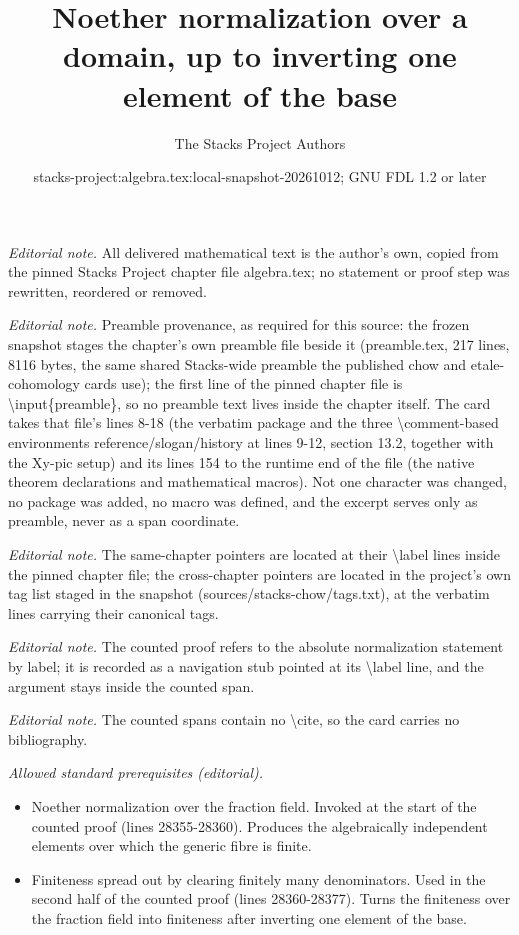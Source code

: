 \documentclass[10pt,a4paper]{amsart}
\title{Noether normalization over a domain, up to inverting one element of the base}
\author{The Stacks Project Authors}
\date{stacks-project:algebra.tex:local-snapshot-20261012; GNU FDL 1.2 or later}
\theoremstyle{plain}
\theoremstyle{definition}
\theoremstyle{remark}
\numberwithin{equation}{subsection}
\begin{document}
\maketitle
\noindent\textit{Editorial note.} All delivered mathematical text is the author's own, copied from the pinned Stacks Project chapter file algebra.tex; no statement or proof step was rewritten, reordered or removed.\par\medskip
\noindent\textit{Editorial note.} Preamble provenance, as required for this source: the frozen snapshot stages the chapter's own preamble file beside it (preamble.tex, 217 lines, 8116 bytes, the same shared Stacks-wide preamble the published chow and etale-cohomology cards use); the first line of the pinned chapter file is \textbackslash{}input\{preamble\}, so no preamble text lives inside the chapter itself. The card takes that file's lines 8-18 (the verbatim package and the three \textbackslash{}comment-based environments reference/slogan/history at lines 9-12, section 13.2, together with the Xy-pic setup) and its lines 154 to the runtime end of the file (the native theorem declarations and mathematical macros). Not one character was changed, no package was added, no macro was defined, and the excerpt serves only as preamble, never as a span coordinate.\par\medskip
\noindent\textit{Editorial note.} The same-chapter pointers are located at their \textbackslash{}label lines inside the pinned chapter file; the cross-chapter pointers are located in the project's own tag list staged in the snapshot (sources/stacks-chow/tags.txt), at the verbatim lines carrying their canonical tags.\par\medskip
\noindent\textit{Editorial note.} The counted proof refers to the absolute normalization statement by label; it is recorded as a navigation stub pointed at its \textbackslash{}label line, and the argument stays inside the counted span.\par\medskip
\noindent\textit{Editorial note.} The counted spans contain no \textbackslash{}cite, so the card carries no bibliography.\par\medskip
\noindent\textit{Allowed standard prerequisites (editorial).}\begin{itemize}
\item Noether normalization over the fraction field. Invoked at the start of the counted proof (lines 28355-28360). Produces the algebraically independent elements over which the generic fibre is finite.
\item Finiteness spread out by clearing finitely many denominators. Used in the second half of the counted proof (lines 28360-28377). Turns the finiteness over the fraction field into finiteness after inverting one element of the base.
\end{itemize}\medskip
\end{document}
